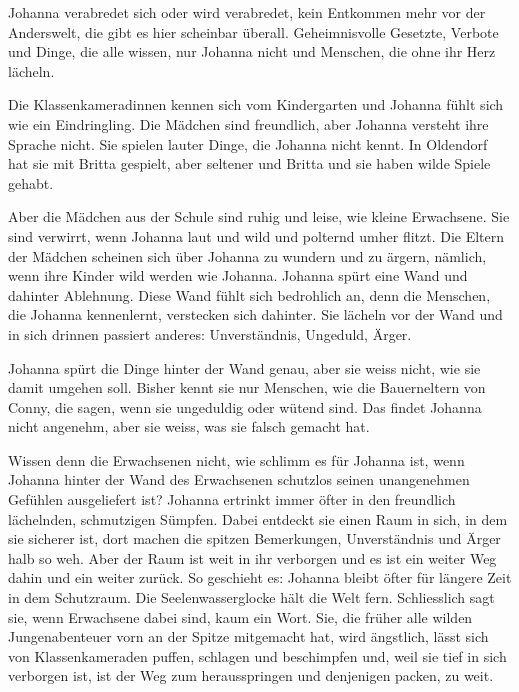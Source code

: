 \documentclass[10pt,titlepage,a5paper]{book}
\begin{document}
Johanna verabredet sich oder wird verabredet, kein Entkommen mehr vor der Anderswelt, die gibt es hier scheinbar überall. Geheimnisvolle Gesetzte, Verbote und Dinge, die alle wissen, nur Johanna nicht und Menschen, die ohne ihr Herz lächeln.

Die Klassenkameradinnen kennen sich vom Kindergarten und Johanna fühlt sich wie ein Eindringling. Die Mädchen sind freundlich, aber Johanna versteht ihre Sprache nicht. Sie spielen lauter Dinge, die Johanna nicht kennt. In Oldendorf hat sie mit Britta gespielt, aber seltener und Britta und sie haben wilde Spiele gehabt.

Aber die Mädchen aus der Schule sind ruhig und leise, wie kleine Erwachsene. Sie sind verwirrt, wenn Johanna laut und wild und polternd umher flitzt. Die Eltern der Mädchen scheinen sich über Johanna zu wundern und zu ärgern, nämlich, wenn ihre Kinder wild werden wie Johanna. Johanna spürt eine Wand und dahinter Ablehnung. Diese Wand fühlt sich bedrohlich an, denn die Menschen, die Johanna kennenlernt, verstecken sich dahinter. Sie lächeln vor der Wand und in sich drinnen passiert anderes: Unverständnis, Ungeduld, Ärger. 

Johanna spürt die Dinge hinter der Wand genau, aber sie weiss nicht, wie sie damit umgehen soll. Bisher kennt sie nur Menschen, wie die Bauerneltern von Conny, die sagen, wenn sie ungeduldig oder wütend sind. Das findet Johanna nicht angenehm, aber sie weiss, was sie falsch gemacht hat.

Wissen denn die Erwachsenen nicht, wie schlimm es für Johanna ist, wenn Johanna hinter der Wand des Erwachsenen schutzlos seinen unangenehmen Gefühlen ausgeliefert ist? Johanna ertrinkt immer öfter in den freundlich lächelnden, schmutzigen Sümpfen.  Dabei entdeckt sie einen Raum in sich, in dem sie sicherer ist, dort machen die spitzen Bemerkungen, Unverständnis und Ärger halb so weh. Aber der Raum ist weit in ihr verborgen und es ist ein weiter Weg dahin und ein weiter zurück. So geschieht es: Johanna bleibt öfter für längere Zeit in dem Schutzraum. Die Seelenwasserglocke hält die Welt fern. Schliesslich sagt sie, wenn Erwachsene dabei sind, kaum ein Wort. Sie, die früher alle wilden Jungenabenteuer  vorn an der Spitze mitgemacht hat, wird ängstlich, lässt sich von Klassenkameraden puffen, schlagen und beschimpfen und, weil sie tief in sich verborgen ist, ist der Weg zum herausspringen und denjenigen packen, zu weit.
\end{document}
